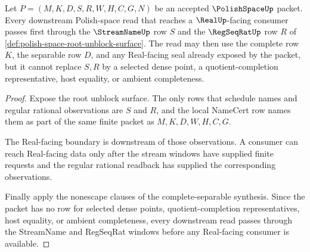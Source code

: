 \begin{theorem}
\label{thm:polish-space-regseqrat-window-unblock}
Let $P=(M,K,D,S,R,W,H,C,G,N)$ be an accepted $\PolishSpaceUp$ packet. Every
downstream Polish-space read that reaches a $\RealUp$-facing consumer passes
first through the $\StreamNameUp$ row $S$ and the $\RegSeqRatUp$ row $R$ of
\autoref{def:polish-space-root-unblock-surface}. The read may then use the
complete row $K$, the separable row $D$, and any Real-facing seal already
exposed by the packet, but it cannot replace $S,R$ by a selected dense point,
a quotient-completion representative, host equality, or ambient completeness.
\end{theorem}
\begin{proof}
Expose the root unblock surface. The only rows that schedule names and regular
rational observations are $S$ and $R$, and the local NameCert row names them
as part of the same finite packet as $M,K,D,W,H,C,G$.

The Real-facing boundary is downstream of those observations. A consumer can
reach Real-facing data only after the stream windows have supplied finite
requests and the regular rational readback has supplied the corresponding
observations.

Finally apply the nonescape clauses of the complete-separable synthesis. Since
the packet has no row for selected dense points, quotient-completion
representatives, host equality, or ambient completeness, every downstream
read passes through the StreamName and RegSeqRat windows before any
Real-facing consumer is available.
\end{proof}

